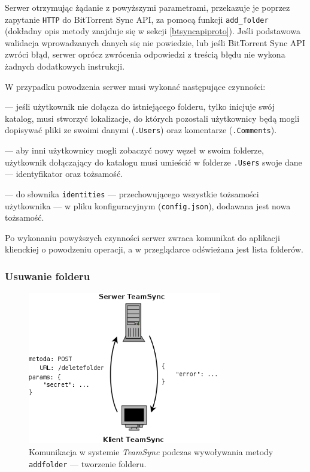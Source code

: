 Serwer otrzymując żądanie z powyższymi parametrami, przekazuje je poprzez zapytanie \texttt{HTTP} do BitTorrent Sync API, za pomocą funkcji \texttt{add\_folder} (dokładny opis metody znajduje się w sekcji \ref{btsyncapiproto}). Jeśli podstawowa walidacja wprowadzanych danych się nie powiedzie, lub jeśli BitTorrent Sync API zwróci błąd, serwer oprócz zwrócenia odpowiedzi z treścią błędu nie wykona żadnych dodatkowych instrukcji.

W przypadku powodzenia serwer musi wykonać następujące czynności:

\begin{description}[noitemsep]
  \item[Utworzenie folderów \texttt{.Comments} oraz \texttt{.Users}] --- jeśli użytkownik nie dołącza do istniejącego folderu, tylko inicjuje swój katalog, musi stworzyć lokalizacje, do których pozostali użytkownicy będą mogli dopisywać pliki ze swoimi danymi (\texttt{.Users}) oraz komentarze (\texttt{.Comments}).
  
  \item[Uaktualnienie folderu \texttt{.Users}] --- aby inni użytkownicy mogli zobaczyć nowy węzeł w swoim folderze, użytkownik dołączający do katalogu musi umieścić w folderze \texttt{.Users} swoje dane --- identyfikator oraz tożsamość.
  
  \item[Uaktualnienie pliku konfiguracyjnego] --- do słownika \texttt{identities} --- przechowującego wszystkie tożsamości użytkownika --- w pliku konfiguracyjnym (\texttt{config.json}), dodawana jest nowa tożsamość.
\end{description}

Po wykonaniu powyższych czynności serwer zwraca komunikat do aplikacji klienckiej o powodzeniu operacji, a w przeglądarce odświeżana jest lista folderów.

\subsubsection*{Usuwanie folderu}

\begin{figure}[h!]
  \vspace{5pt}
  \begin{center}
    \includegraphics[width=240pt]{figures/metdeletefolder.png}
  \end{center}
  \caption{Komunikacja w systemie \emph{TeamSync} podczas wywoływania metody \texttt{addfolder} --- tworzenie folderu.}
  \label{picmetdeletefolder}
\end{figure}

